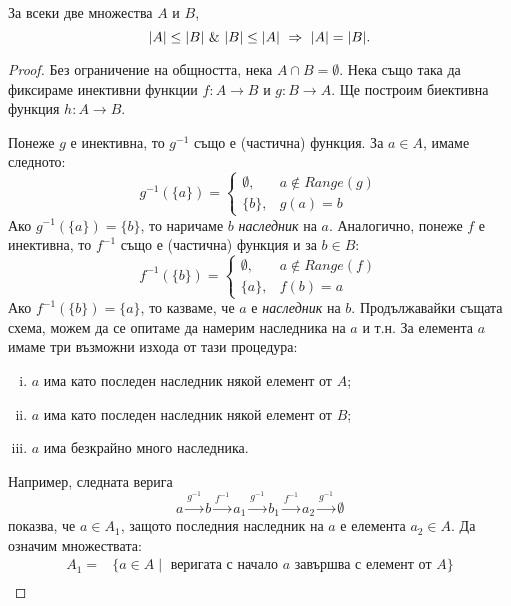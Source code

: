 \begin{framed}
\begin{thm}
  \label{th:ksb}
  За всеки две множества $A$ и $B$,
  \[\abs{A}\leq\abs{B}\ \&\ \abs{B}\leq\abs{A}\ \Rightarrow\ \abs{A} = \abs{B}.\]
\end{thm}
\end{framed}
\begin{proof}
  Без ограничение на общността, нека $A\cap B = \emptyset$.
  Нека също така да фиксираме инективни функции $f:A\rightarrow B$ и $g:B\rightarrow A$.
  Ще построим биективна функция $h:A\rightarrow B$.
  
  Понеже $g$ е инективна, то $g^{-1}$ също е (частична) функция. За $a\in A$, имаме следното:
  \[
  g^{-1}(\{a\}) = 
  \begin{cases}
    \emptyset, & a \not\in Range(g)\\
    \{b\}, & g(a) = b 
  \end{cases}
  \]
  Ако $g^{-1}(\{a\}) = \{b\}$, то наричаме $b$ {\em наследник} на $a$.
  Аналогично, понеже $f$ е инективна, то $f^{-1}$ също е (частична) функция и за $b\in B$:
  \[
  f^{-1}(\{b\}) = 
  \begin{cases}
    \emptyset, & a \not\in Range(f)\\
    \{a\}, & f(b) = a 
  \end{cases}
  \]
  Ако $f^{-1}(\{b\}) = \{a\}$, то казваме, че $a$ е {\em наследник} на $b$.
  Продължавайки същата схема, можем да се опитаме да намерим наследника на $a$ и т.н.
  За елемента $a$ имаме три възможни изхода от тази процедура:
  \begin{enumerate}[i)]
  \item
    $a$ има като последен наследник някой елемент от $A$;
  \item
    $a$ има като последен наследник някой елемент от $B$;
  \item
    $a$ има безкрайно много наследника.
\end{enumerate}
Например, следната верига
\[a \stackrel{g^{-1}}{\longrightarrow} b \stackrel{f^{-1}}{\longrightarrow}a_1 \stackrel{g^{-1}}{\longrightarrow} b_1 \stackrel{f^{-1}}{\longrightarrow}a_2\stackrel{g^{-1}}{\longrightarrow}\emptyset\]
показва, че $a \in A_1$, защото последния наследник на $a$ е елемента $a_2 \in A$.
Да означим множествата:
\begin{align*}
  A_1 = & \{a\in A \mid \mbox{ веригата с начало $a$ завършва с елемент от } A\}\\

\end{align*}
\end{proof}
